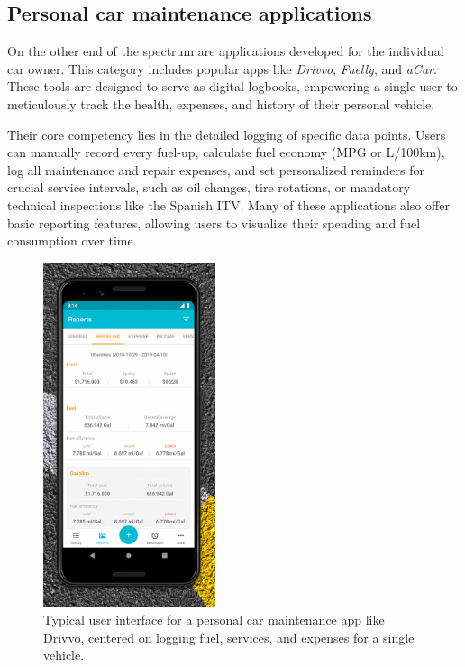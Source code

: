 \subsection{Personal car maintenance applications}
On the other end of the spectrum are applications developed for the individual car owner. This category includes popular apps like \textit{Drivvo}, \textit{Fuelly}, and \textit{aCar}. These tools are designed to serve as digital logbooks, empowering a single user to meticulously track the health, expenses, and history of their personal vehicle.

\textgap

Their core competency lies in the detailed logging of specific data points. Users can manually record every fuel-up, calculate fuel economy (MPG or L/100km), log all maintenance and repair expenses, and set personalized reminders for crucial service intervals, such as oil changes, tire rotations, or mandatory technical inspections like the Spanish ITV. Many of these applications also offer basic reporting features, allowing users to visualize their spending and fuel consumption over time.

\begin{figure}[H]
    \centering
    \includegraphics[width=0.45\textwidth]{images/background/drivvo-dashboard.png}
    \caption{Typical user interface for a personal car maintenance app like Drivvo, centered on logging fuel, services, and expenses for a single vehicle.}
\end{figure}

